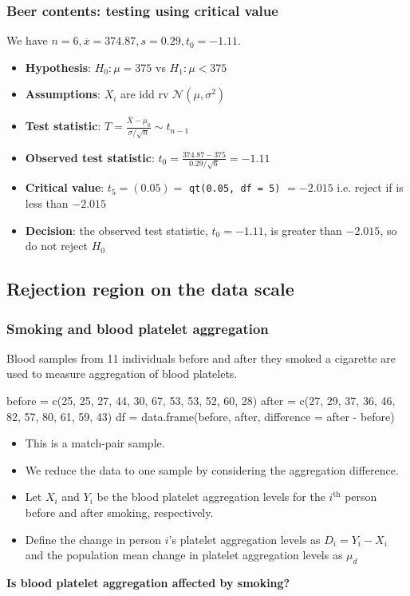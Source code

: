 \documentclass[a4paper]{article}\usepackage[]{graphicx}\usepackage[]{xcolor}
\begin{document}
\subsubsection{Beer contents: testing using critical value}
We have \( n = 6, \overline{x} = 374.87, s = 0.29, t_0 = -1.11 \).
\begin{itemize}
	\item \textbf{Hypothesis}: \( H_0: \mu = 375 \) vs \( H_1: \mu < 375 \)
	\item \textbf{Assumptions}: \( X_i \) are idd rv \( \mathcal{N}(\mu,\sigma^2) \)
	\item \textbf{Test statistic}: \( T = \frac{\overline{X}-\mu_0}{\sigma/\sqrt{n}} \sim t_{n-1} \)
	\item \textbf{Observed test statistic}: \( t_0 = \frac{374.87 - 375}{0.29 /\sqrt{6}} = -1.11 \)
	\item \textbf{Critical value}: \( t_5 = (0.05) = \)  \lstinline|qt(0.05, df = 5)| \( = -2.015 \) i.e. reject if 
	is less than \( -2.015 \) 
	\item \textbf{Decision}: the observed test statistic, \( t_0 = -1.11 \), is greater than \( -2.015 \), so do not reject \( H_0 \)
\end{itemize}
\subsection{Rejection region on the data scale}
\subsubsection{Smoking and blood platelet aggregation}
Blood samples from 11 individuals before and after they smoked a cigarette are used to measure aggregation of blood platelets.

\begin{Schunk}
\begin{Sinput}
before = c(25, 25, 27, 44, 30, 67, 53, 53, 52, 60, 28)
after =  c(27, 29, 37, 36, 46, 82, 57, 80, 61, 59, 43)
df = data.frame(before, after, difference = after - before)
\end{Sinput}
\end{Schunk}
\begin{itemize}
	\item This is a match-pair sample.
	\item We reduce the data to one sample by considering the aggregation difference.
	\item Let \( X_i \) and \( Y_i \) be the blood platelet aggregation levels for the \( i^{\text{th}} \) person before and after smoking, respectively.
	\item Define the change in person \( i \)'s platelet aggregation levels as \( D_i = Y_i - X_i \) and the population mean change in platelet aggregation levels as \( \mu_d \) 
\end{itemize}
\begin{greenbox}
	\textbf{Is blood platelet aggregation affected by smoking?}
\end{greenbox}
\end{document}
